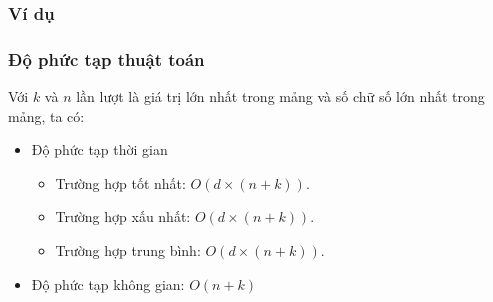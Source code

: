 \subsubsection{Ví dụ}

\subsubsection{Độ phức tạp thuật toán}

Với $k$ và $n$ lần lượt là giá trị lớn nhất trong mảng và số chữ số lớn nhất trong mảng, ta có:

\begin{itemize}
    \item Độ phức tạp thời gian
    \begin{itemize}[label=$\circ$]
        \item Trường hợp tốt nhất: $O(d \times (n+k))$.
        \item Trường hợp xấu nhất: $O(d \times (n+k))$.
        \item Trường hợp trung bình: $O(d \times (n+k))$. 
    \end{itemize}
    
    \item Độ phức tạp không gian: $O(n + k)$
\end{itemize}
